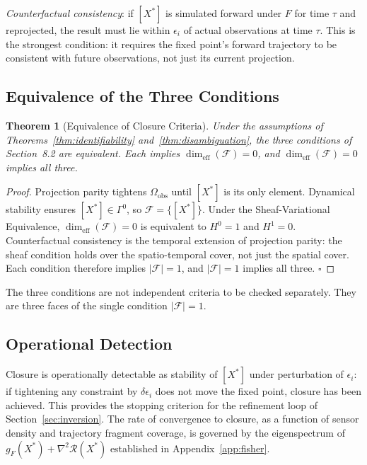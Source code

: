 \documentclass[11pt, oneside]{article}
\newtheorem{theorem}{Theorem}[section]
\begin{document}
\emph{Counterfactual consistency}: if $[X^*]$ is simulated forward under $F$ for time
$\tau$ and reprojected, the result must lie within $\epsilon_i$ of actual observations
at time $\tau$. This is the strongest condition: it requires the fixed point's forward
trajectory to be consistent with future observations, not just its current projection.

\subsection{Equivalence of the Three Conditions}

\begin{theorem}[Equivalence of Closure Criteria]
\label{thm:closure_equiv}
Under the assumptions of Theorems~\ref{thm:identifiability} and~\ref{thm:disambiguation},
the three conditions of Section~8.2 are equivalent. Each implies
$\dim_{\mathrm{eff}}(\mathcal{F}) = 0$, and $\dim_{\mathrm{eff}}(\mathcal{F}) = 0$
implies all three.
\end{theorem}

\begin{proof}
Projection parity tightens $\Omega_{\mathrm{obs}}$ until $[X^*]$ is its only element.
Dynamical stability ensures $[X^*] \in \Gamma^0$, so $\mathcal{F} = \{[X^*]\}$. Under
the Sheaf-Variational Equivalence, $\dim_{\mathrm{eff}}(\mathcal{F}) = 0$ is equivalent
to $H^0 = 1$ and $H^1 = 0$. Counterfactual consistency is the temporal extension of
projection parity: the sheaf condition holds over the spatio-temporal cover, not just the
spatial cover. Each condition therefore implies $|\mathcal{F}| = 1$, and $|\mathcal{F}|
= 1$ implies all three. $\square$
\end{proof}

The three conditions are not independent criteria to be checked separately. They are
three faces of the single condition $|\mathcal{F}| = 1$.

\subsection{Operational Detection}

Closure is operationally detectable as stability of $[X^*]$ under perturbation of
$\epsilon_i$: if tightening any constraint by $\delta\epsilon_i$ does not move the fixed
point, closure has been achieved. This provides the stopping criterion for the refinement
loop of Section~\ref{sec:inversion}. The rate of convergence to closure, as a function of
sensor density and trajectory fragment coverage, is governed by the eigenspectrum of
$g_F(X^*) + \nabla^2\mathcal{R}(X^*)$ established in Appendix~\ref{app:fisher}.
\end{document}
